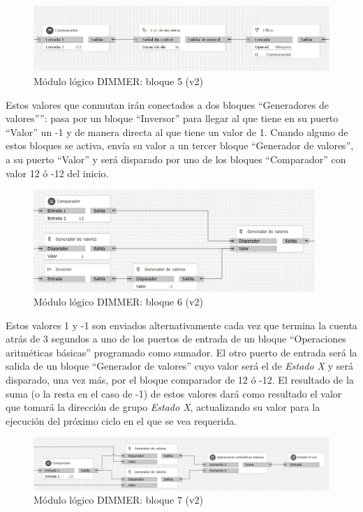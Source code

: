 \begin{figure}[H]
\includegraphics[width=1\textwidth]{figures/log_dimm_b25.png}  
\caption{Módulo lógico DIMMER: bloque 5 (v2)}
\label{fig:log_dimm_b25}
\end{figure}

Estos valores que conmutan irán conectados a dos bloques “Generadores de valores””: pasa por un bloque “Inversor” para llegar al que tiene en su puerto “Valor” un -1 y de manera directa al que tiene un valor de 1. Cuando alguno de estos bloques se activa, envía su valor a un tercer bloque “Generador de valores”, a su puerto “Valor” y será disparado por uno de los bloques “Comparador” con valor 12 ó -12 del inicio.

\begin{figure}[H]
\centering
\includegraphics[width=0.95\textwidth]{figures/log_dimm_b26.png}  
\caption{Módulo lógico DIMMER: bloque 6 (v2)}
\label{fig:log_dimm_b26}
\end{figure}

Estos valores 1 y -1 son enviados alternativamente cada vez que termina la cuenta atrás de 3 segundos a uno de los puertos de entrada de un bloque “Operaciones aritméticas básicas” programado como sumador. El otro puerto de entrada será la salida de un bloque “Generador de valores” cuyo valor será el de \textit{Estado X} y será disparado, una vez más, por el bloque comparador de 12 ó -12. El resultado de la suma (o la resta en el caso de -1) de estos valores dará como resultado el valor que tomará la dirección de grupo \textit{Estado X}, actualizando su valor para la ejecución del próximo ciclo en el que se vea requerida.

\begin{figure}[H]
\includegraphics[width=1\textwidth]{figures/log_dimm_b27.png}  
\caption{Módulo lógico DIMMER: bloque 7 (v2)}
\label{fig:log_dimm_b27}
\end{figure}

